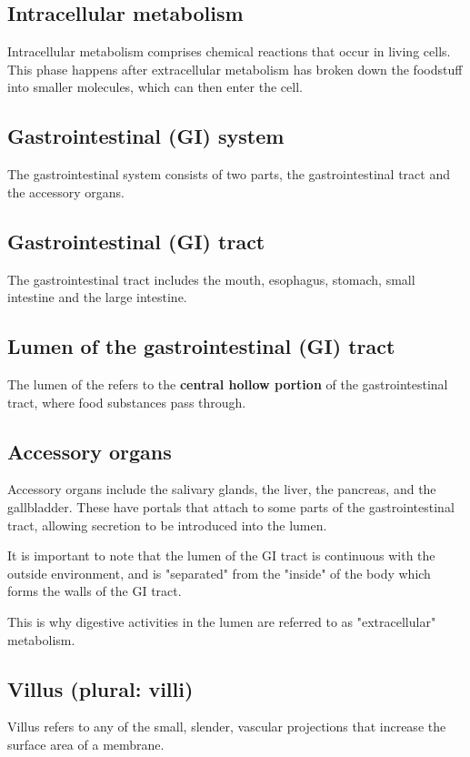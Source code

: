 \documentclass[11pt]{article}
\begin{document}
\subsection{Intracellular metabolism}
\label{sec:orgaa1852c}
Intracellular metabolism comprises chemical reactions that occur in living cells. This phase happens after extracellular metabolism has broken down the foodstuff into smaller molecules, which can then enter the cell.
\subsection{Gastrointestinal (GI) system}
\label{sec:org2434e87}
The gastrointestinal system consists of two parts, the gastrointestinal tract and the accessory organs.
\subsection{Gastrointestinal (GI) tract}
\label{sec:orgaa68cc1}
The gastrointestinal tract includes the mouth, esophagus, stomach, small intestine and the large intestine.
\subsection{Lumen of the gastrointestinal (GI) tract}
\label{sec:org293098d}
The lumen of the refers to the \textbf{central hollow portion} of the gastrointestinal tract, where food substances pass through.

\newpage
\subsection{Accessory organs}
\label{sec:orgc78c635}
Accessory organs include the salivary glands, the liver, the pancreas, and the gallbladder. These have portals that attach to some parts of the gastrointestinal tract, allowing secretion to be introduced into the lumen.


It is important to note that the lumen of the GI tract is continuous with the outside environment, and is "separated" from the "inside" of the body which forms the walls of the GI tract.


This is why digestive activities in the lumen are referred to as "extracellular" metabolism.
\subsection{Villus (plural: villi)}
\label{sec:org4f80b9b}
Villus refers to any of the small, slender, vascular projections that increase the surface area of a membrane.
\end{document}
